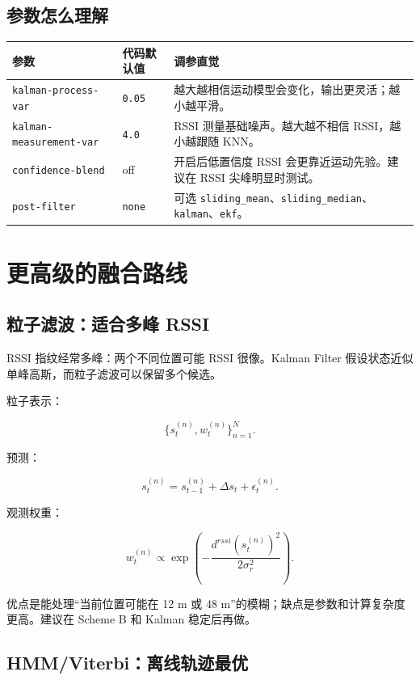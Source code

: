 \documentclass[11pt,a4paper,openany]{report}
\newcommand{\code}[1]{\nolinkurl{#1}}
\newcommand{\param}[1]{\nolinkurl{#1}}
\begin{document}
\section{参数怎么理解}

\begin{longtable}{p{}p{}p{}}
\toprule
参数 & 代码默认值 & 调参直觉 \\
\midrule
\param{kalman-process-var} & \code{0.05} & 越大越相信运动模型会变化，输出更灵活；越小越平滑。 \\
\param{kalman-measurement-var} & \code{4.0} & RSSI 测量基础噪声。越大越不相信 RSSI，越小越跟随 KNN。 \\
\param{confidence-blend} & off & 开启后低置信度 RSSI 会更靠近运动先验。建议在 RSSI 尖峰明显时测试。 \\
  \param{post-filter} & \code{none} & 可选 \code{sliding_mean}、\code{sliding_median}、\code{kalman}、\code{ekf}。 \\
\bottomrule
\end{longtable}

\chapter{更高级的融合路线}
\label{chap:advanced}

\section{粒子滤波：适合多峰 RSSI}

RSSI 指纹经常多峰：两个不同位置可能 RSSI 很像。Kalman Filter 假设状态近似单峰高斯，而粒子滤波可以保留多个候选。

粒子表示：

\[
  \{s_t^{(n)}, w_t^{(n)}\}_{n=1}^{N}.
\]

预测：

\[
  s_t^{(n)} =
  s_{t-1}^{(n)} + \Delta s_t + \epsilon_t^{(n)}.
\]

观测权重：

\[
  w_t^{(n)}
  \propto
  \exp\left(
    -\frac{d^{rssi}(s_t^{(n)})^2}{2\sigma_r^2}
  \right).
\]

优点是能处理“当前位置可能在 12 m 或 48 m”的模糊；缺点是参数和计算复杂度更高。建议在 Scheme B 和 Kalman 稳定后再做。

\section{HMM/Viterbi：离线轨迹最优}
\end{document}
